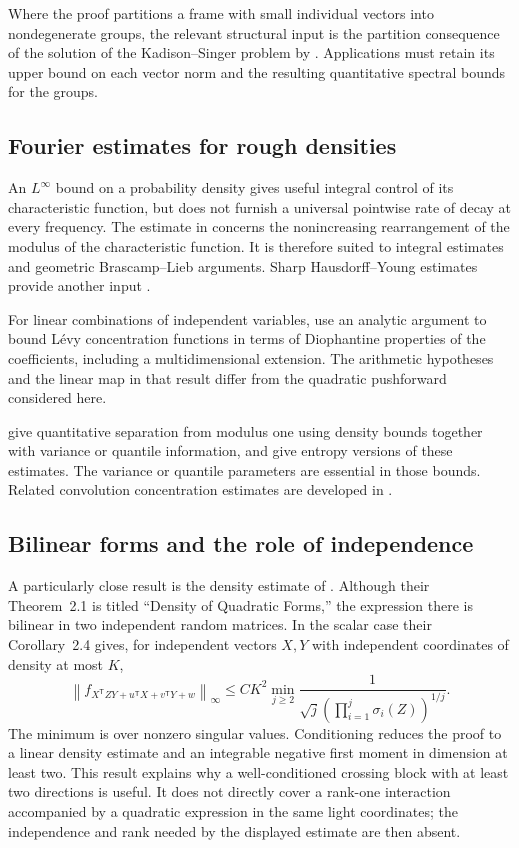 Where the proof partitions a frame with small individual vectors into nondegenerate groups, the relevant structural input is the partition consequence of the solution of the Kadison--Singer problem by \citet{MSS2015}. Applications must retain its upper bound on each vector norm and the resulting quantitative spectral bounds for the groups.

\subsection{Fourier estimates for rough densities}

An $L^\infty$ bound on a probability density gives useful integral control of its characteristic function, but does not furnish a universal pointwise rate of decay at every frequency. The estimate in \citet[Lemma~3.1]{RV2015} concerns the nonincreasing rearrangement of the modulus of the characteristic function. It is therefore suited to integral estimates and geometric Brascamp--Lieb arguments. Sharp Hausdorff--Young estimates provide another input \citep{Beckner1975}.

For linear combinations of independent variables, \citet{FS2007} use an analytic argument to bound L\'evy concentration functions in terms of Diophantine properties of the coefficients, including a multidimensional extension. The arithmetic hypotheses and the linear map in that result differ from the quadratic pushforward considered here.

\citet[Theorems~1--2 and~8]{BCG2012} give quantitative separation from modulus one using density bounds together with variance or quantile information, and give entropy versions of these estimates. The variance or quantile parameters are essential in those bounds. Related convolution concentration estimates are developed in \citet{BC2015}.

\subsection{Bilinear forms and the role of independence}

A particularly close result is the density estimate of \citet[Section~2]{BGKS2024}. Although their Theorem~2.1 is titled ``Density of Quadratic Forms,'' the expression there is bilinear in two independent random matrices. In the scalar case their Corollary~2.4 gives, for independent vectors $X,Y$ with independent coordinates of density at most $K$,
\[
 \left\|f_{X^{\mathsf T}ZY+u^{\mathsf T}X+v^{\mathsf T}Y+w}\right\|_\infty
 \leq C K^2\min_{j\geq2}
 \frac{1}{\sqrt j\left(\prod_{i=1}^j\sigma_i(Z)\right)^{1/j}}.
\]
The minimum is over nonzero singular values. Conditioning reduces the proof to a linear density estimate and an integrable negative first moment in dimension at least two. This result explains why a well-conditioned crossing block with at least two directions is useful. It does not directly cover a rank-one interaction accompanied by a quadratic expression in the same light coordinates; the independence and rank needed by the displayed estimate are then absent.

